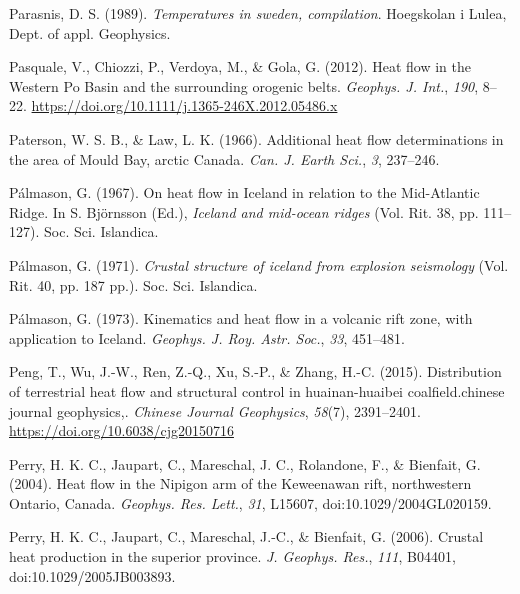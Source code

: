 \documentclass[draft,linenumbers]{agujournal2018}
\begin{document}
\leavevmode{}%
Parasnis, D. S. (1989). \emph{Temperatures in sweden, compilation}.
Hoegskolan i Lulea, Dept. of appl. Geophysics.

\leavevmode{}%
Pasquale, V., Chiozzi, P., Verdoya, M., \& Gola, G. (2012). Heat flow in
the {Western Po Basin} and the surrounding orogenic belts.
\emph{Geophys. J. Int.}, \emph{190}, 8--22.
\url{https://doi.org/10.1111/j.1365-246X.2012.05486.x}

\leavevmode{}%
Paterson, W. S. B., \& Law, L. K. (1966). Additional heat flow
determinations in the area of {Mould Bay}, arctic {Canada}. \emph{Can.
J. Earth Sci.}, \emph{3}, 237--246.

\leavevmode{}%
Pálmason, G. (1967). On heat flow in {Iceland} in relation to the
{Mid-Atlantic Ridge}. In S. Björnsson (Ed.), \emph{Iceland and mid-ocean
ridges} (Vol. Rit. 38, pp. 111--127). Soc. Sci. Islandica.

\leavevmode{}%
Pálmason, G. (1971). \emph{Crustal structure of iceland from explosion
seismology} (Vol. Rit. 40, pp. 187 pp.). Soc. Sci. Islandica.

\leavevmode{}%
Pálmason, G. (1973). Kinematics and heat flow in a volcanic rift zone,
with application to {Iceland}. \emph{Geophys. J. Roy. Astr. Soc.},
\emph{33}, 451--481.

\leavevmode{}%
Peng, T., Wu, J.-W., Ren, Z.-Q., Xu, S.-P., \& Zhang, H.-C. (2015).
Distribution of terrestrial heat flow and structural control in
huainan-huaibei coalfield.chinese journal geophysics,. \emph{Chinese
Journal Geophysics}, \emph{58}(7), 2391--2401.
\url{https://doi.org/10.6038/cjg20150716}

\leavevmode{}%
Perry, H. K. C., Jaupart, C., Mareschal, J. C., Rolandone, F., \&
Bienfait, G. (2004). Heat flow in the {Nipigon} arm of the {Keweenawan}
rift, northwestern {Ontario, Canada}. \emph{Geophys. Res. Lett.},
\emph{31}, L15607, doi:10.1029/2004GL020159.

\leavevmode{}%
Perry, H. K. C., Jaupart, C., Mareschal, J.-C., \& Bienfait, G. (2006).
Crustal heat production in the superior province. \emph{J. Geophys.
Res.}, \emph{111}, B04401, doi:10.1029/2005JB003893.
\end{document}
